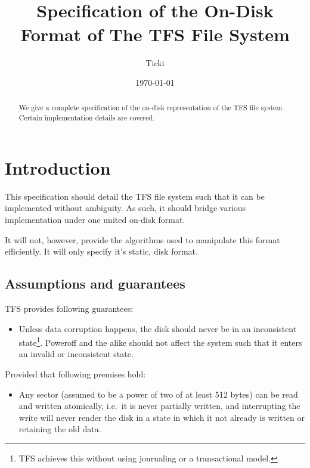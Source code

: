 \documentclass[11pt,a4paper]{report}
\title{
    \centering{}\\
    Specification of the On-Disk Format of The TFS File System
}
\author{Ticki}
\date{\today}
\newcommand{\minimumsectorsize}{512 }
\begin{document}
    \maketitle

    \begin{abstract}
        We give a complete specification of the on-disk representation of the
        TFS file system. Certain implementation details are covered.
    \end{abstract}

    \tableofcontents

    \chapter{Introduction}
    This specification should detail the TFS file system such that it can be
    implemented without ambiguity. As such, it should bridge various
    implementation under one united on-disk format.

    It will not, however, provide the algorithms used to manipulate this format
    efficiently. It will only specify it's static, disk format.

    \section{Assumptions and guarantees}
    \label{assumptions_guarantees}
        TFS provides following guarantees:

        \begin{itemize}
            \item Unless data corruption happens, the disk should never be in
                an inconsistent state\footnote{TFS achieves this without using
                journaling or a transactional model.}. Poweroff and the alike
                should not affect the system such that it enters an invalid or
                inconsistent state.
        \end{itemize}

        Provided that following premises hold:

        \begin{itemize}
            \item Any sector (assumed to be a power of two of at least
                \minimumsectorsize bytes) can be read and written atomically,
                i.e.\ it is never partially written, and interrupting the write
                will never render the disk in a state in which it not already
                is written or retaining the old data.
        \end{itemize}
\end{document}
